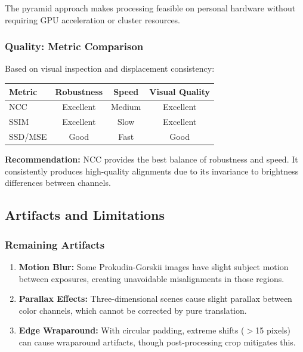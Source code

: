 \documentclass[11pt]{article}
\begin{document}
The pyramid approach makes processing feasible on personal hardware without requiring GPU acceleration or cluster resources.

\subsubsection{Quality: Metric Comparison}

Based on visual inspection and displacement consistency:

\begin{center}
\begin{tabular}{|l|c|c|c|}
\hline
\textbf{Metric} & \textbf{Robustness} & \textbf{Speed} & \textbf{Visual Quality} \\
\hline
NCC & Excellent & Medium & Excellent \\
SSIM & Excellent & Slow & Excellent \\
SSD/MSE & Good & Fast & Good \\
\hline
\end{tabular}
\end{center}

\textbf{Recommendation:} NCC provides the best balance of robustness and speed. It consistently produces high-quality alignments due to its invariance to brightness differences between channels.

\subsection{Artifacts and Limitations}

\subsubsection{Remaining Artifacts}

\begin{enumerate}
\item \textbf{Motion Blur:} Some Prokudin-Gorskii images have slight subject motion between exposures, creating unavoidable misalignments in those regions.

\item \textbf{Parallax Effects:} Three-dimensional scenes cause slight parallax between color channels, which cannot be corrected by pure translation.

\item \textbf{Edge Wraparound:} With circular padding, extreme shifts ($>$15 pixels) can cause wraparound artifacts, though post-processing crop mitigates this.
\end{enumerate}
\end{document}
